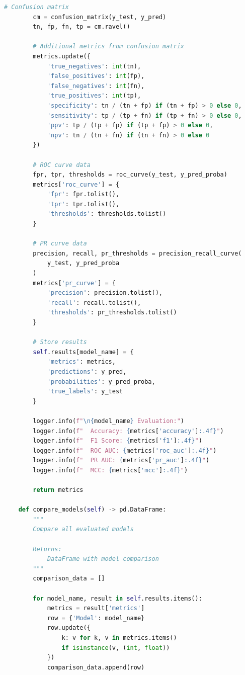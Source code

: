 \begin{lstlisting}[language=Python, caption=Comprehensive Model Evaluation]
        # Confusion matrix
        cm = confusion_matrix(y_test, y_pred)
        tn, fp, fn, tp = cm.ravel()

        # Additional metrics from confusion matrix
        metrics.update({
            'true_negatives': int(tn),
            'false_positives': int(fp),
            'false_negatives': int(fn),
            'true_positives': int(tp),
            'specificity': tn / (tn + fp) if (tn + fp) > 0 else 0,
            'sensitivity': tp / (tp + fn) if (tp + fn) > 0 else 0,
            'ppv': tp / (tp + fp) if (tp + fp) > 0 else 0,
            'npv': tn / (tn + fn) if (tn + fn) > 0 else 0
        })

        # ROC curve data
        fpr, tpr, thresholds = roc_curve(y_test, y_pred_proba)
        metrics['roc_curve'] = {
            'fpr': fpr.tolist(),
            'tpr': tpr.tolist(),
            'thresholds': thresholds.tolist()
        }

        # PR curve data
        precision, recall, pr_thresholds = precision_recall_curve(
            y_test, y_pred_proba
        )
        metrics['pr_curve'] = {
            'precision': precision.tolist(),
            'recall': recall.tolist(),
            'thresholds': pr_thresholds.tolist()
        }

        # Store results
        self.results[model_name] = {
            'metrics': metrics,
            'predictions': y_pred,
            'probabilities': y_pred_proba,
            'true_labels': y_test
        }

        logger.info(f"\n{model_name} Evaluation:")
        logger.info(f"  Accuracy: {metrics['accuracy']:.4f}")
        logger.info(f"  F1 Score: {metrics['f1']:.4f}")
        logger.info(f"  ROC AUC: {metrics['roc_auc']:.4f}")
        logger.info(f"  PR AUC: {metrics['pr_auc']:.4f}")
        logger.info(f"  MCC: {metrics['mcc']:.4f}")

        return metrics

    def compare_models(self) -> pd.DataFrame:
        """
        Compare all evaluated models

        Returns:
            DataFrame with model comparison
        """
        comparison_data = []

        for model_name, result in self.results.items():
            metrics = result['metrics']
            row = {'Model': model_name}
            row.update({
                k: v for k, v in metrics.items()
                if isinstance(v, (int, float))
            })
            comparison_data.append(row)


\end{lstlisting}
